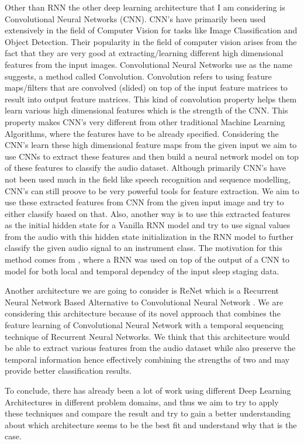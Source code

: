 \documentclass[11pt]{article}
\begin{document}
Other than RNN the other deep learning architecture that I am considering is Convolutional Neural Networks (CNN). CNN's have primarily been used extensively in the field of Computer Vision for tasks like Image Classification \cite{krizhevsky2012imagenet} and Object Detection. Their popularity in the field of computer vision arises from the fact that they are very good at extracting/learning different high dimensional features from the input images. Convolutional Neural Networks use as the name suggests, a method called Convolution. Convolution refers to using feature maps/filters that are convolved (slided) on top of the input feature matrices to result into output feature matrices. This kind of convolution property helps them learn various high dimensional features which is the strength of the CNN. This property makes CNN's very different from other traditional Machine Learning Algorithms, where the features have to be already specified. Considering the CNN's learn these high dimensional feature maps from the given input we aim to use CNNs to extract these features and then build a neural network model on top of these features to classify the audio dataset. Although primarily CNN's have not been used much in the field like speech recognition and sequence modelling, CNN's can still proove to be very powerful tools for feature extraction. We aim to use these extracted features from CNN from the given input image and try to either classify based on that. Also, another way is to use this extracted features as the initial hidden state for a Vanilla RNN model and try to use signal values from the audio with this hidden state initialization in the RNN model to further classify the given audio signal to an instrument class. The motivation for this method comes from \cite{aggarwalstructured}, where a RNN was used on top of the output of a CNN to model for both local and temporal dependcy of the input sleep staging data.

Another architecture we are going to consider is ReNet which is a Recurrent Neural Network Based Alternative to Convolutional Neural Network \cite{visin2015renet}. We are considering this architecture because of its novel approach that combines the feature learning of Convolutional Neural Network with a temporal sequencing technique of Recurrent Neural Networks. We think that this architecture would be able to extract various features from the audio dataset while also preserve the temporal information hence effectively combining the strengths of two and may provide better classification results. 

To conclude, there has already been a lot of work using different Deep Learning Architectures in different problem domains, and thus we aim to try to apply these techniques and compare the result and try to gain a better understanding about which architecture seems to be the best fit and understand why that is the case.




\end{document}
